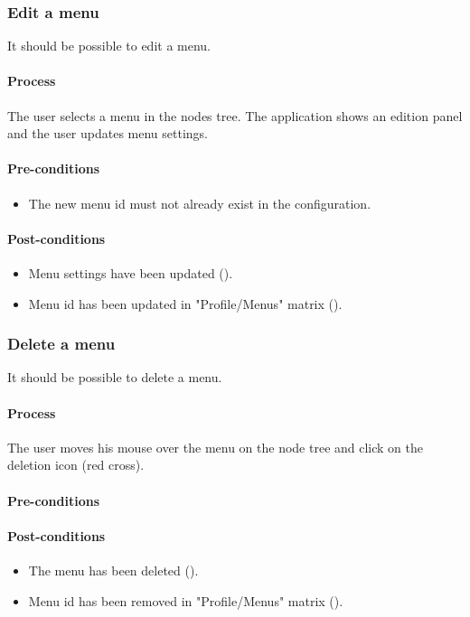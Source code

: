 \documentclass[11pt,a4paper,oneside]{article}
\begin{document}
\subsubsection{Edit a menu}
It should be possible to edit a menu.

\paragraph{Process}
The user selects a menu in the nodes tree. The application shows an edition panel and the user updates menu settings.

\paragraph{Pre-conditions}
\begin{itemize}
	\item The new menu id must not already exist in the configuration.
\end{itemize}

\paragraph{Post-conditions}
\begin{itemize}
	\item Menu settings have been updated ().
	\item Menu id has been updated in "Profile/Menus" matrix ().
\end{itemize}

\subsubsection{Delete a menu}
It should be possible to delete a menu.

\paragraph{Process}
The user moves his mouse over the menu on the node tree and click on the deletion icon (red cross).

\paragraph{Pre-conditions}

\paragraph{Post-conditions}
\begin{itemize}
	\item The menu has been deleted ().
	\item Menu id has been removed in "Profile/Menus" matrix ().
\end{itemize}
\end{document}

